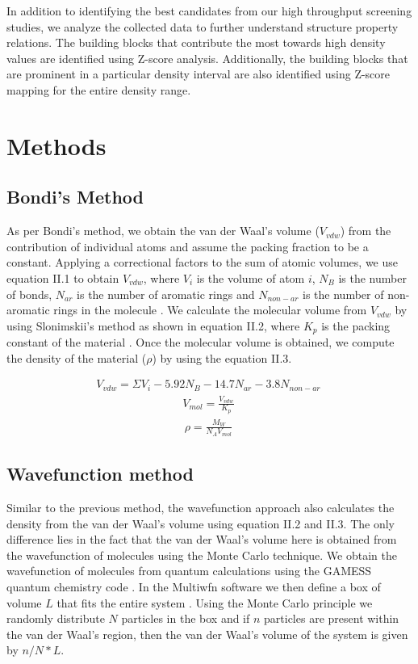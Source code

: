 In addition to identifying the best candidates from our high throughput screening studies, we analyze the collected data to further understand structure property relations. The building blocks that contribute the most towards high density values are identified using Z-score analysis. Additionally, the building blocks that are prominent in a particular density interval are also identified using Z-score mapping for the entire density range. 



\section{Methods}
\label{sec:methods}

\subsection{Bondi's Method}
\label{subsec:bondis}

As per Bondi's method, we obtain the van der Waal’s volume ($V{}_{vdw}$) from the contribution of individual atoms \cite{Bondi1964} and assume the packing fraction to be a constant. Applying a correctional factors to the sum of atomic volumes, we use equation II.1 to obtain $V{}_{vdw}$, where $V_i$ is the volume of atom $i$, $N_B$ is the number of bonds, $N_{ar}$ is the number of aromatic rings and $N_{non-ar}$ is the number of non-aromatic rings in the molecule \cite{Zhao2003}. We calculate the molecular volume from $V{}_{vdw}$ by using Slonimskii's method as shown in equation II.2, where $K_p$ is the packing constant of the material \cite{Slonimskii1970}. Once the molecular volume is obtained, we compute the density of the material ($\rho$) by using the equation II.3.

\begin{align}
V{}_{vdw}=\Sigma V_i - 5.92N{}_B - 14.7N{}_{ar} - 3.8N{}_{non-ar}\
\end{align}
\begin{align}
V{}_{mol}=\frac{V{}_{vdw}}{K{}_p}\
\end{align}
\begin{align}
\rho=\frac{M{}_W}{N{}_A V{}_{mol}}\
\end{align}

\subsection{Wavefunction method}
\label{subsec:wavefunction}

Similar to the previous method, the wavefunction approach also calculates the density from the van der Waal's volume using equation II.2 and II.3. The only difference lies in the fact that the van der Waal's volume here is obtained from the wavefunction of molecules using the Monte Carlo technique. We obtain the wavefunction of molecules from quantum calculations using the GAMESS quantum chemistry code \cite{Micheal1993}. In the Multiwfn software we then define a box of volume $L$ that fits the entire system \cite{Lu2012}. Using the Monte Carlo principle we randomly distribute $N$ particles in the box and if $n$ particles are present within the van der Waal's region, then the van der Waal's volume of the system is given by $n/N*L$. 


